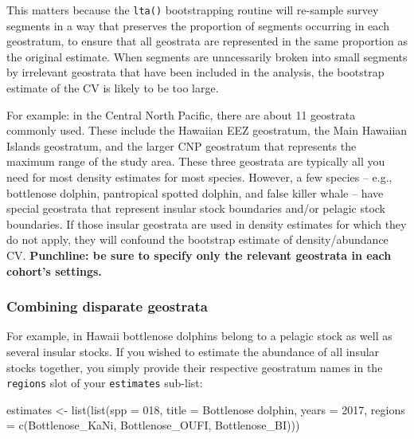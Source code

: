 \documentclass[
]{book}
\newenvironment{Shaded}{\begin{snugshade}}{\end{snugshade}}
\newcommand{\AttributeTok}[1]{\textcolor[rgb]{0.77,0.63,0.00}{#1}}
\newcommand{\DecValTok}[1]{\textcolor[rgb]{0.00,0.00,0.81}{#1}}
\newcommand{\FunctionTok}[1]{\textcolor[rgb]{0.00,0.00,0.00}{#1}}
\newcommand{\NormalTok}[1]{#1}
\newcommand{\OtherTok}[1]{\textcolor[rgb]{0.56,0.35,0.01}{#1}}
\newcommand{\StringTok}[1]{\textcolor[rgb]{0.31,0.60,0.02}{#1}}
\begin{document}
This matters because the \texttt{lta()} bootstrapping routine will re-sample survey segments in a way that preserves the proportion of segments occurring in each geostratum, to ensure that all geostrata are represented in the same proportion as the original estimate. When segments are unncessarily broken into small segments by irrelevant geostrata that have been included in the analysis, the bootstrap estimate of the CV is likely to be too large.

For example: in the Central North Pacific, there are about 11 geostrata commonly used. These include the Hawaiian EEZ geostratum, the Main Hawaiian Islands geostratum, and the larger CNP geostratum that represents the maximum range of the study area. These three geostrata are typically all you need for most density estimates for most species. However, a few species -- e.g., bottlenose dolphin, pantropical spotted dolphin, and false killer whale -- have special geostrata that represent insular stock boundaries and/or pelagic stock boundaries. If those insular geostrata are used in density estimates for which they do not apply, they will confound the bootstrap estimate of density/abundance CV. \textbf{Punchline: be sure to specify only the relevant geostrata in each cohort's settings.}

\hypertarget{combining-disparate-geostrata}{%
\subsubsection*{Combining disparate geostrata}\label{combining-disparate-geostrata}}

For example, in Hawaii bottlenose dolphins belong to a pelagic stock as well as several insular stocks. If you wished to estimate the abundance of all insular stocks together, you simply provide their respective geostratum names in the \texttt{regions} slot of your \texttt{estimates} sub-list:

\begin{Shaded}
\begin{Highlighting}[]
\NormalTok{estimates }\OtherTok{\textless{}{-}} \FunctionTok{list}\NormalTok{(}\FunctionTok{list}\NormalTok{(}\AttributeTok{spp =} \StringTok{\textquotesingle{}018\textquotesingle{}}\NormalTok{,}
                       \AttributeTok{title =} \StringTok{\textquotesingle{}Bottlenose dolphin\textquotesingle{}}\NormalTok{,}
                       \AttributeTok{years =} \DecValTok{2017}\NormalTok{,}
                       \AttributeTok{regions =} \FunctionTok{c}\NormalTok{(}\StringTok{\textquotesingle{}Bottlenose\_KaNi\textquotesingle{}}\NormalTok{,}
                                   \StringTok{\textquotesingle{}Bottlenose\_OUFI\textquotesingle{}}\NormalTok{,}
                                   \StringTok{\textquotesingle{}Bottlenose\_BI\textquotesingle{}}\NormalTok{)))}
\end{Highlighting}
\end{Shaded}
\end{document}
